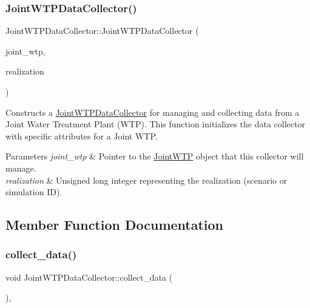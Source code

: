 \subsubsection{\texorpdfstring{Joint\+W\+T\+P\+Data\+Collector()}{JointWTPDataCollector()}}
{\footnotesize\ttfamily Joint\+W\+T\+P\+Data\+Collector\+::\+Joint\+W\+T\+P\+Data\+Collector (\begin{DoxyParamCaption}\item[{\mbox{\hyperlink{classJointWTP}{Joint\+W\+TP}} $\ast$}]{joint\+\_\+wtp,  }\item[{unsigned long}]{realization }\end{DoxyParamCaption})\hspace{0.3cm}{\ttfamily [explicit]}}



Constructs a \mbox{\hyperlink{classJointWTPDataCollector}{Joint\+W\+T\+P\+Data\+Collector}} for managing and collecting data from a Joint Water Treatment Plant (W\+TP). This function initializes the data collector with specific attributes for a Joint W\+TP. 


\begin{DoxyParams}{Parameters}
{\em joint\+\_\+wtp} & Pointer to the \mbox{\hyperlink{classJointWTP}{Joint\+W\+TP}} object that this collector will manage. \\
\hline
{\em realization} & Unsigned long integer representing the realization (scenario or simulation ID). \\
\hline
\end{DoxyParams}


\subsection{Member Function Documentation}
\mbox{\label{classJointWTPDataCollector_a64383431902c18f1d90a33fbcc211658}} 
\subsubsection{\texorpdfstring{collect\+\_\+data()}{collect\_data()}}
{\footnotesize\ttfamily void Joint\+W\+T\+P\+Data\+Collector\+::collect\+\_\+data (\begin{DoxyParamCaption}{ }\end{DoxyParamCaption})\hspace{0.3cm}{\ttfamily [override]}, {\ttfamily [virtual]}}



